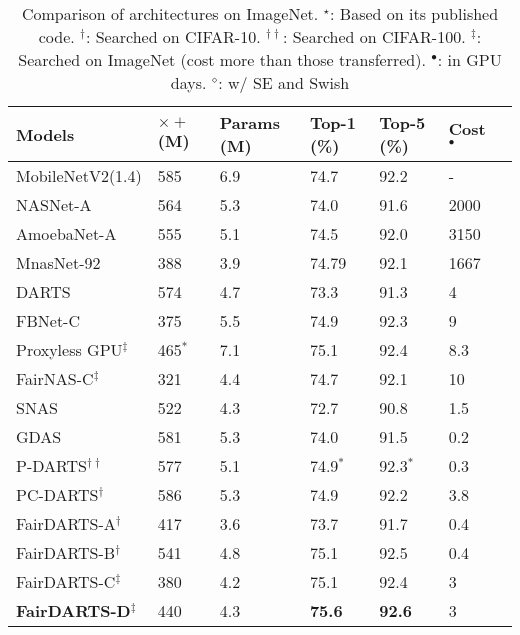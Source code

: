 \documentclass[runningheads]{llncs}
\begin{document}
\setlength{\tabcolsep}{4pt}
\begin{table}
	\begin{center}
	\caption{Comparison of architectures on ImageNet. $^\star$: Based on its published code. $^\dagger$: Searched on CIFAR-10. $^{\dagger\dagger}$: Searched on CIFAR-100. $^\ddagger$: Searched on ImageNet (cost more than those transferred). $^\bullet$: in GPU days. $^{\diamond}$: w/ SE and Swish} 
	\label{tab:comparison-imagenet}
	  \begin{footnotesize}
		\begin{tabular}{*{7}{l}} 			
		\hline\noalign{\smallskip}
			Models & $\times+$ (M)  &Params (M) & Top-1 (\%) & Top-5 (\%) & Cost$^\bullet$ \\
\hline\noalign{\smallskip} 
			MobileNetV2(1.4) \cite{sandler2018mobilenetv2}   & 585 & 6.9 & 74.7 & 92.2 &-\\
			\hline\noalign{\smallskip}
			NASNet-A \cite{zoph2017learning}  & 564 & 5.3 &74.0 & 91.6& 2000\\
			AmoebaNet-A\cite{real2018regularized} & 555  & 5.1 & 74.5 &92.0& 3150 \\
                       MnasNet-92 \cite{tan2018mnasnet}  & 388 & 3.9 & 74.79 & 92.1 & 1667\\ 	
\hline\noalign{\smallskip}
			DARTS \cite{liu2018darts} & 574 & 4.7 & 73.3 & 91.3& 4\\
FBNet-C \cite{wu2018fbnet}   & 375 & 5.5 &  74.9 & 92.3 & 9 \\ 
Proxyless GPU$^\ddagger$ \cite{cai2018proxylessnas}  & 465$^*$ & 7.1  & 75.1 & 92.4 & 8.3\\
			FairNAS-C$^\ddagger$ \cite{chu2019fairnas} &321 & 4.4 & 74.7 &92.1 & 10 \\
			SNAS \cite{xie2018snas}  &522&4.3&72.7&90.8 & 1.5\\
			GDAS \cite{dong2019searching}  &581&5.3&74.0&91.5 & 0.2\\
			P-DARTS$^{\dagger\dagger} $\cite{chen2019progressive}& 577 & 5.1 & 74.9$^{*}$ & 92.3$^{*}$ & 0.3 \\  PC-DARTS$^\dagger$ \cite{xu2019pc} & 586 & 5.3 & 74.9 & 92.2& 3.8\\ 
			FairDARTS-A$^\dagger$ & 417 & 3.6 &73.7 & 91.7& 0.4 \\
		        FairDARTS-B$^\dagger$ & 541 & 4.8 &75.1 & 92.5& 0.4 \\
			FairDARTS-C$^\ddagger$ & 380 &4.2 &75.1 & 92.4 &3\\
			\textbf{FairDARTS-D}$^\ddagger$ & 440 & 4.3 & \textbf{75.6} & \textbf{92.6}&3 \\

\end{tabular}
\end{footnotesize}
\end{center}
\end{table}
\end{document}
